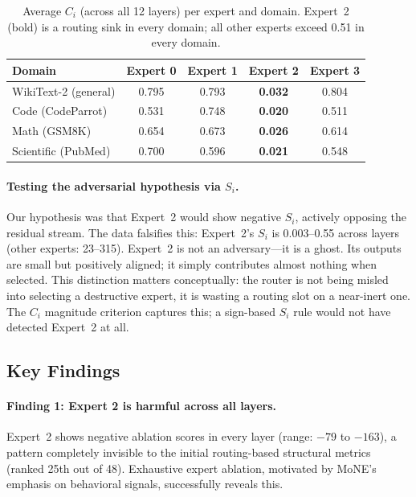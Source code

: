 \documentclass{article}
\begin{document}
\begin{table}[t]
\caption{Average $C_i$ (across all 12 layers) per expert and domain. Expert~2 (bold) is a routing sink in every domain; all other experts exceed 0.51 in every domain.}
\label{tab:domain}
\centering
\small
\begin{tabular}{lcccc}
\toprule
\textbf{Domain} & \textbf{Expert 0} & \textbf{Expert 1} & \textbf{Expert 2} & \textbf{Expert 3} \\
\midrule
WikiText-2 (general) & 0.795 & 0.793 & \textbf{0.032} & 0.804 \\
Code (CodeParrot)    & 0.531 & 0.748 & \textbf{0.020} & 0.511 \\
Math (GSM8K)         & 0.654 & 0.673 & \textbf{0.026} & 0.614 \\
Scientific (PubMed)  & 0.700 & 0.596 & \textbf{0.021} & 0.548 \\
\bottomrule
\end{tabular}
\end{table}

\paragraph{Testing the adversarial hypothesis via $S_i$.}
Our hypothesis was that Expert~2 would show negative $S_i$, actively opposing the residual stream. The data falsifies this: Expert~2's $S_i$ is 0.003--0.55 across layers (other experts: 23--315). Expert~2 is not an adversary---it is a ghost. Its outputs are small but positively aligned; it simply contributes almost nothing when selected. This distinction matters conceptually: the router is not being misled into selecting a destructive expert, it is wasting a routing slot on a near-inert one. The $C_i$ magnitude criterion captures this; a sign-based $S_i$ rule would not have detected Expert~2 at all.

\subsection{Key Findings}

\paragraph{Finding 1: Expert 2 is harmful across all layers.}
Expert~2 shows negative ablation scores in every layer (range: $-79$ to $-163$), a pattern completely invisible to the initial routing-based structural metrics (ranked 25th out of 48). Exhaustive expert ablation, motivated by MoNE's \citep{zhang2025mone} emphasis on behavioral signals, successfully reveals this.
\end{document}
